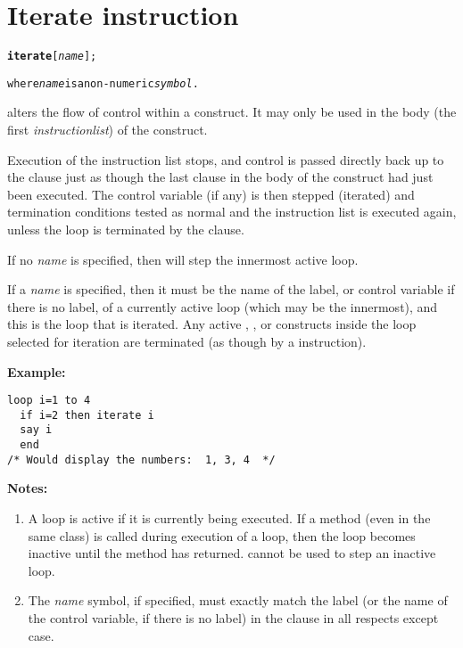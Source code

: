 \chapter{Iterate instruction}
\index{,}
\begin{shaded}
\begin{alltt}
\textbf{iterate} [\emph{name}];

where \emph{name} is a non-numeric \emph{symbol}.
\end{alltt}
\end{shaded}
  alters the flow of control within a 
construct.
It may only be used in the body (the first \emph{instructionlist})
of the construct.

Execution of the instruction list stops, and control is passed
directly back up to the  clause just as though the last
clause in the body of the construct had just been executed.
The control variable (if any) is then stepped (iterated) and termination
conditions tested as normal and the instruction list is executed again,
unless the loop is terminated by the  clause.

If no \emph{name} is specified, then  will step
the innermost active loop.
 
If a \emph{name} is specified, then it must be the name of the
label, or control variable if there is no label, of a currently active
loop (which may be the innermost), and this is the loop that is
iterated.
Any active , , or  constructs
inside the loop selected for iteration are terminated (as though by a
 instruction).

\textbf{Example:}
\begin{lstlisting}
loop i=1 to 4
  if i=2 then iterate i
  say i
  end
/* Would display the numbers:  1, 3, 4  */
\end{lstlisting}
 \textbf{Notes:}
\begin{enumerate}
\item A loop is active if it is currently being executed.
If a method (even in the same class) is called during execution of a
loop, then the loop becomes inactive until the method has returned.
 cannot be used to step an inactive loop.
\item The \emph{name} symbol, if specified, must exactly match the
label (or the name of the control variable, if there is no label) in the
 clause in all respects except case.
\end{enumerate}
